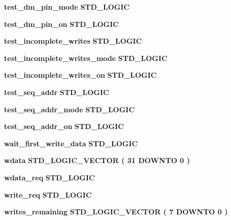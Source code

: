 \begin{DoxyCompactItemize}
\item 
{\bf test\+\_\+dm\+\_\+pin\+\_\+mode} {\bfseries \textcolor{comment}{S\+T\+D\+\_\+\+L\+O\+G\+IC}\textcolor{vhdlchar}{ }} 
\item 
{\bf test\+\_\+dm\+\_\+pin\+\_\+on} {\bfseries \textcolor{comment}{S\+T\+D\+\_\+\+L\+O\+G\+IC}\textcolor{vhdlchar}{ }} 
\item 
{\bf test\+\_\+incomplete\+\_\+writes} {\bfseries \textcolor{comment}{S\+T\+D\+\_\+\+L\+O\+G\+IC}\textcolor{vhdlchar}{ }} 
\item 
{\bf test\+\_\+incomplete\+\_\+writes\+\_\+mode} {\bfseries \textcolor{comment}{S\+T\+D\+\_\+\+L\+O\+G\+IC}\textcolor{vhdlchar}{ }} 
\item 
{\bf test\+\_\+incomplete\+\_\+writes\+\_\+on} {\bfseries \textcolor{comment}{S\+T\+D\+\_\+\+L\+O\+G\+IC}\textcolor{vhdlchar}{ }} 
\item 
{\bf test\+\_\+seq\+\_\+addr} {\bfseries \textcolor{comment}{S\+T\+D\+\_\+\+L\+O\+G\+IC}\textcolor{vhdlchar}{ }} 
\item 
{\bf test\+\_\+seq\+\_\+addr\+\_\+mode} {\bfseries \textcolor{comment}{S\+T\+D\+\_\+\+L\+O\+G\+IC}\textcolor{vhdlchar}{ }} 
\item 
{\bf test\+\_\+seq\+\_\+addr\+\_\+on} {\bfseries \textcolor{comment}{S\+T\+D\+\_\+\+L\+O\+G\+IC}\textcolor{vhdlchar}{ }} 
\item 
{\bf wait\+\_\+first\+\_\+write\+\_\+data} {\bfseries \textcolor{comment}{S\+T\+D\+\_\+\+L\+O\+G\+IC}\textcolor{vhdlchar}{ }} 
\item 
{\bf wdata} {\bfseries \textcolor{comment}{S\+T\+D\+\_\+\+L\+O\+G\+I\+C\+\_\+\+V\+E\+C\+T\+OR}\textcolor{vhdlchar}{ }\textcolor{vhdlchar}{(}\textcolor{vhdlchar}{ }\textcolor{vhdlchar}{ } \textcolor{vhdldigit}{31} \textcolor{vhdlchar}{ }\textcolor{keywordflow}{D\+O\+W\+N\+TO}\textcolor{vhdlchar}{ }\textcolor{vhdlchar}{ } \textcolor{vhdldigit}{0} \textcolor{vhdlchar}{ }\textcolor{vhdlchar}{)}\textcolor{vhdlchar}{ }} 
\item 
{\bf wdata\+\_\+req} {\bfseries \textcolor{comment}{S\+T\+D\+\_\+\+L\+O\+G\+IC}\textcolor{vhdlchar}{ }} 
\item 
{\bf write\+\_\+req} {\bfseries \textcolor{comment}{S\+T\+D\+\_\+\+L\+O\+G\+IC}\textcolor{vhdlchar}{ }} 
\item 
{\bf writes\+\_\+remaining} {\bfseries \textcolor{comment}{S\+T\+D\+\_\+\+L\+O\+G\+I\+C\+\_\+\+V\+E\+C\+T\+OR}\textcolor{vhdlchar}{ }\textcolor{vhdlchar}{(}\textcolor{vhdlchar}{ }\textcolor{vhdlchar}{ } \textcolor{vhdldigit}{7} \textcolor{vhdlchar}{ }\textcolor{keywordflow}{D\+O\+W\+N\+TO}\textcolor{vhdlchar}{ }\textcolor{vhdlchar}{ } \textcolor{vhdldigit}{0} \textcolor{vhdlchar}{ }\textcolor{vhdlchar}{)}\textcolor{vhdlchar}{ }} 
\end{DoxyCompactItemize}


